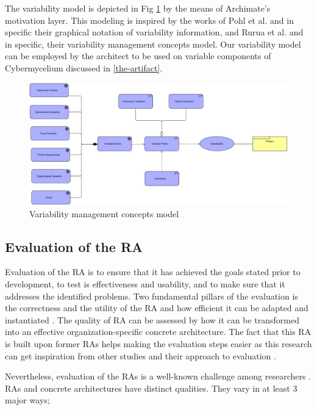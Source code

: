 \documentclass{bmcart}
\begin{document}
The variability model is depicted in Fig \ref{variability} by the means of Archimate's motivation layer. This modeling is inspired by the works of Pohl et al. \cite{pohl2005software} and in specific their graphical notation of variability information, and Rurua et al. \cite{rurua2019representing} and in specific, their variability management concepts model. Our variability model can be employed by the architect to be used on variable components of Cybermycelium discussed in \ref{the-artifact}.

\begin{figure}[h!]
    \centering
    \includegraphics[width=12cm]{variability-model.JPG}
    \caption{Variability management concepts model}
    \label{variability}
\end{figure}

\subsection{Evaluation of the RA}

Evaluation of the RA is to ensure that it has achieved the goals stated prior to development, to test is effectiveness and usability, and to make sure that it addresses the identified problems. Two fundamental pillars of the evaluation is the correctness and the utility of the RA and how efficient it can be adapted and instantiated \cite{galster2011empirically}. The quality of RA can be assessed by how it can be transformed into an effective organization-specific concrete architecture. The fact that this RA is built upon former RAs helps making the evaluation steps easier as this research can get inspiration from other studies and their approach to evaluation \cite{sharpe2019industrial}.

Nevertheless, evaluation of the RAs is a well-known challenge among researchers \cite{angelov2008contracting,Avgeriou,Cioroaica,Maier}. RAs and concrete architectures have distinct qualities. They vary in at least 3 major ways;
\end{document}
